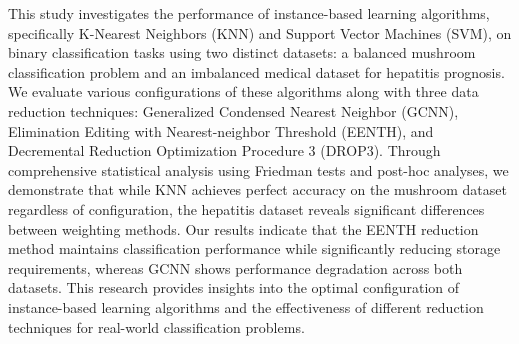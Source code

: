This study investigates the performance of instance-based learning algorithms, specifically K-Nearest Neighbors (KNN) and Support Vector Machines (SVM), on binary classification tasks using two distinct datasets: a balanced mushroom classification problem and an imbalanced medical dataset for hepatitis prognosis. We evaluate various configurations of these algorithms along with three data reduction techniques: Generalized Condensed Nearest Neighbor (GCNN), Elimination Editing with Nearest-neighbor Threshold (EENTH), and Decremental Reduction Optimization Procedure 3 (DROP3). Through comprehensive statistical analysis using Friedman tests and post-hoc analyses, we demonstrate that while KNN achieves perfect accuracy on the mushroom dataset regardless of configuration, the hepatitis dataset reveals significant differences between weighting methods. Our results indicate that the EENTH reduction method maintains classification performance while significantly reducing storage requirements, whereas GCNN shows performance degradation across both datasets. This research provides insights into the optimal configuration of instance-based learning algorithms and the effectiveness of different reduction techniques for real-world classification problems.